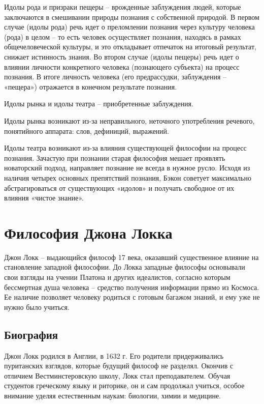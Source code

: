 \documentclass[a4paper, 14pt]{extreport}
\begin{document}
Идолы рода и призраки пещеры -- врожденные заблуждения людей, которые
заключаются в смешивании природы познания с собственной природой. В
первом случае (идолы рода) речь идет о преломлении познания через
культуру человека (рода) в целом -- то есть человек осуществляет
познания, находясь в рамках общечеловеческой культуры, и это откладывает
отпечаток на итоговый результат, снижает истинность знания. Во втором
случае (идолы пещеры) речь идет о влиянии личности конкретного человека
(познающего субъекта) на процесс познания. В итоге личность человека
(его предрассудки, заблуждения -- «пещера») отражается в конечном
результате познания.

Идолы рынка и идолы театра -- приобретенные заблуждения.

Идолы рынка возникают из-за неправильного, неточного употребления
речевого, понятийного аппарата: слов, дефиниций, выражений.

Идолы театра возникают из-за влияния существующей философии на процесс
познания. Зачастую при познании старая философия мешает проявлять
новаторский подход, направляет познание не всегда в нужное русло. Исходя
из наличия четырех основных препятствий познания, Бэкон советует
максимально абстрагироваться от существующих «идолов» и получать
свободное от их влияния «чистое знание».

\section{Философия Джона Локка}

Джон Локк -- выдающийся философ 17 века, оказавший существенное влияние
на становление западной философии. До Локка западные философы основывали
свои взгляды на учении Платона и других идеалистов, согласно которым
бессмертная душа человека -- средство получения информации прямо из
Космоса. Ее наличие позволяет человеку родиться с готовым багажом
знаний, и ему уже не нужно было учиться.

\subsection{Биография}

Джон Локк родился в Англии, в 1632 г. Его родители придерживались
пуританских взглядов, которые будущий философ не разделял. Окончив с
отличием Вестминстеровскую школу, Локк стал преподавателем. Обучая
студентов греческому языку и риторике, он и сам продолжал учиться,
особое внимание уделяя естественным наукам: биологии, химии и медицине.
\end{document}
